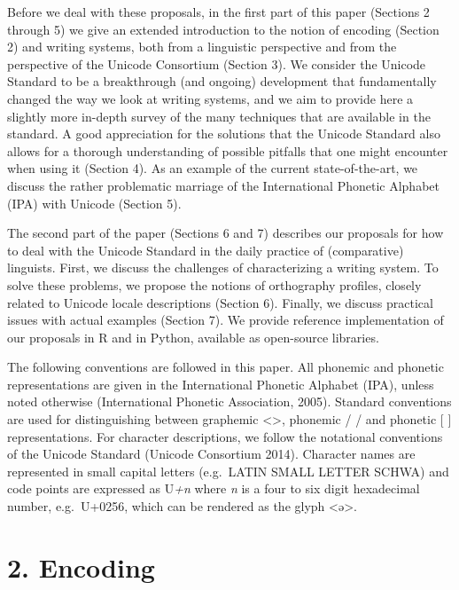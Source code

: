 Before we deal with these proposals, in the first part of this paper (Sections 2 through 5) we give an extended introduction to the notion of encoding (Section 2) and writing systems, both from a linguistic perspective and from the perspective of the Unicode Consortium (Section 3). We consider the Unicode Standard to be a breakthrough (and ongoing) development that fundamentally changed the way we look at writing systems, and we aim to provide here a slightly more in-depth survey of the many techniques that are available in the standard. A good appreciation for the solutions that the Unicode Standard also allows for a thorough understanding of possible pitfalls that one might encounter when using it (Section 4). As an example of the current state-of-the-art, we discuss the rather problematic marriage of the International Phonetic Alphabet (IPA) with Unicode (Section 5).

The second part of the paper (Sections 6 and 7) describes our proposals for how to deal with the Unicode Standard in the daily practice of (comparative) linguists. First, we discuss the challenges of characterizing a writing system. To solve these problems, we propose the notions of orthography profiles, closely related to Unicode locale descriptions (Section 6). Finally, we discuss practical issues with actual examples (Section 7). We provide reference implementation of our proposals in R and in Python, available as open-source libraries.

The following conventions are followed in this paper. All phonemic and phonetic representations are given in the International Phonetic Alphabet (IPA), unless noted otherwise (International Phonetic Association, 2005). Standard conventions are used for distinguishing between graphemic <\textgreater{}, phonemic / / and phonetic {[} {]} representations. For character descriptions, we follow the notational conventions of the Unicode Standard (Unicode Consortium 2014). Character names are represented in small capital letters (e.g.~LATIN SMALL LETTER SCHWA) and code points are expressed as U\emph{+n} where \emph{n} is a four to six digit hexadecimal number, e.g.~U+0256, which can be rendered as the glyph <ə>.

\section{2. Encoding}\label{encoding}

